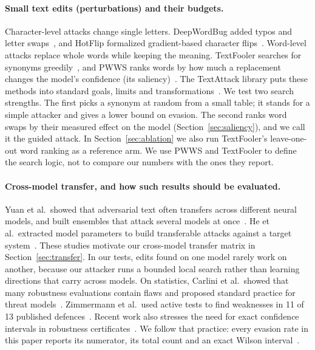 \paragraph{Small text edits (perturbations) and their budgets.}
Character-level attacks change single letters. DeepWordBug added typos and
letter swaps~\cite{gao2018deepwordbug}, and HotFlip formalized gradient-based
character flips~\cite{ebrahimi2018hotflip}. Word-level attacks replace whole
words while keeping the meaning. TextFooler searches for synonyms
greedily~\cite{jin2020textfooler}, and PWWS ranks words by how much a replacement
changes the model's confidence (its saliency)~\cite{ren2019pwws}. The TextAttack
library puts these methods into standard goals, limits and
transformations~\cite{morris2020textattack}. We test two search strengths. The
first picks a synonym at random from a small table; it stands for a simple
attacker and gives a lower bound on evasion. The second ranks word swaps by their
measured effect on the model (Section~\ref{sec:saliency}), and we call it the guided
attack. In Section~\ref{sec:ablation} we also run TextFooler's leave-one-out word
ranking as a reference arm. We use PWWS and TextFooler to define the search
logic, not to compare our numbers with the ones they report.

\paragraph{Cross-model transfer, and how such results should be evaluated.}
Yuan et al.\ showed that adversarial text often transfers across different
neural models, and built ensembles that attack several models at
once~\cite{yuan2021transfer}. He et al.\ extracted model parameters to build
transferable attacks against a target system~\cite{he2021extraction}. These
studies motivate our cross-model transfer matrix in Section~\ref{sec:transfer}. In our
tests, edits found on one model rarely work on another, because our attacker runs
a bounded local search rather than learning directions that carry across models.
On statistics, Carlini et al.\ showed that many robustness evaluations contain
flaws and proposed standard practice for threat models~\cite{carlini2019evaluating}.
Zimmermann et al.\ used active tests to find weaknesses in 11 of 13 published
defences~\cite{zimmermann2022confidence}. Recent work also stresses the need for
exact confidence intervals in robustness certificates~\cite{voracek2024statistical}.
We follow that practice: every evasion rate in this paper reports its numerator,
its total count and an exact Wilson interval~\cite{nistwilson}.
